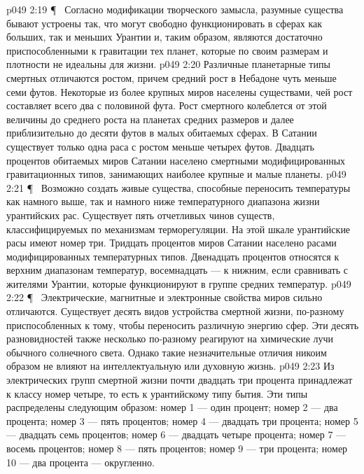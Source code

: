 \vs p049 2:19 \P\ \bibnobreakspace {} Согласно модификации творческого замысла, разумные существа бывают устроены так, что могут свободно функционировать в сферах как больших, так и меньших Урантии и, таким образом, являются достаточно приспособленными к гравитации тех планет, которые по своим размерам и плотности не идеальны для жизни.
\vs p049 2:20 Различные планетарные типы смертных отличаются ростом, причем средний рост в Небадоне чуть меньше семи футов. Некоторые из более крупных миров населены существами, чей рост составляет всего два с половиной фута. Рост смертного колеблется от этой величины до среднего роста на планетах средних размеров и далее приблизительно до десяти футов в малых обитаемых сферах. В Сатании существует только одна раса с ростом меньше четырех футов. Двадцать процентов обитаемых миров Сатании населено смертными модифицированных гравитационных типов, занимающих наиболее крупные и малые планеты.
\vs p049 2:21 \P\ \bibnobreakspace {} Возможно создать живые существа, способные переносить температуры как намного выше, так и намного ниже температурного диапазона жизни урантийских рас. Существует пять отчетливых чинов существ, классифицируемых по механизмам терморегуляции. На этой шкале урантийские расы имеют номер три. Тридцать процентов миров Сатании населено расами модифицированных температурных типов. Двенадцать процентов относятся к верхним диапазонам температур, восемнадцать --- к нижним, если сравнивать с жителями Урантии, которые функционируют в группе средних температур.
\vs p049 2:22 \P\ \bibnobreakspace {} Электрические, магнитные и электронные свойства миров сильно отличаются. Существует десять видов устройства смертной жизни, по\hyp{}разному приспособленных к тому, чтобы переносить различную энергию сфер. Эти десять разновидностей также несколько по\hyp{}разному реагируют на химические лучи обычного солнечного света. Однако такие незначительные отличия никоим образом не влияют на интеллектуальную или духовную жизнь.
\vs p049 2:23 Из электрических групп смертной жизни почти двадцать три процента принадлежат к классу номер четыре, то есть к урантийскому типу бытия. Эти типы распределены следующим образом: номер 1 --- один процент; номер 2 --- два процента; номер 3 --- пять процентов; номер 4 --- двадцать три процента; номер 5 --- двадцать семь процентов; номер 6 --- двадцать четыре процента; номер 7 --- восемь процентов; номер 8 --- пять процентов; номер 9 --- три процента; номер 10 --- два процента --- округленно.
